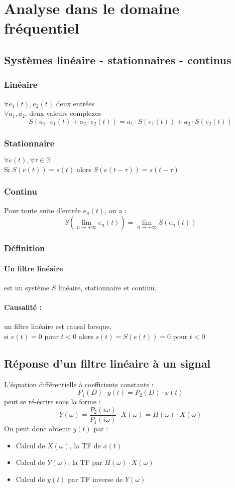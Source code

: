 \documentclass[10pt,a4paper,twoside]{article}
\begin{document}
\section{Analyse dans le domaine fréquentiel}
\subsection{Systèmes linéaire - stationnaires - continus}
\subsubsection{Linéaire}
$\forall e_{1}(t), e_{2}(t)$ deux entrées\\
$\forall a_{1}, a_{2}$, deux valeurs complexes\\
$$S(a_{1}\cdot e_{1}(t)+a_{2}\cdot e_{2}(t)) = a_{1} \cdot S(e_{1}(t))+a_{2} \cdot S(e_{2}(t))$$

\subsubsection{Stationnaire}
$\forall e(t), \forall \tau \in \mathbb{R}$\\
Si $S(e(t))=s(t)$ alors $S(e(t-\tau))=s(t-\tau)$

\subsubsection{Continu}
Pour toute suite d'entrée $e_{n}(t)$, on a :
$$S(\lim\limits_{n\rightarrow+\infty}e_{n}(t))=\lim\limits_{n\rightarrow+\infty}S(e_{n}(t))$$

\subsubsection{Définition}
\paragraph{Un filtre linéaire } est un système $S$ linéaire, stationnaire et continu.

\paragraph{Causalité :} un filtre linéaire est causal lorsque,\\
si $e(t)=0$ pour $t<0$ alors $s(t)=S(e(t))=0$ pour $t<0$

\subsection{Réponse d'un filtre linéaire à un signal}
L'équation différentielle à coefficients constants :
$$P_{1}(D)\cdot y(t) = P_{2}(D)\cdot x(t)$$
peut se ré-écrire sous la forme :
$$Y(\omega) = \frac{P_{2}(i\omega)}{P_{1}(i\omega)}\cdot X(\omega) = H(\omega)\cdot X(\omega)$$
On peut donc obtenir $y(t)$ par :
\begin{itemize}
\item Calcul de $X(\omega)$, la TF de $x(t)$
\item Calcul de $Y(\omega)$, la TF par $H(\omega)\cdot X(\omega)$
\item Calcul de $y(t)$ par TF inverse de $Y(\omega)$
\end{itemize}
\end{document}
